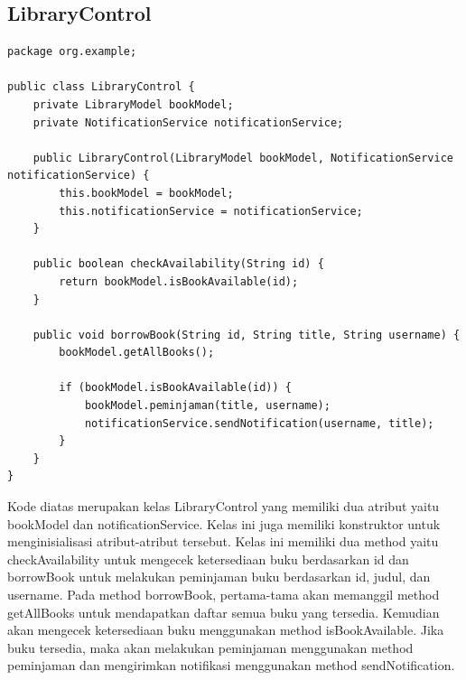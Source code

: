 \documentclass[a4paper,12pt]{article}
\begin{document}
\subsection{LibraryControl}
\begin{lstlisting}[style=javastyle, caption={LibraryControl.java}]
package org.example;

public class LibraryControl {
    private LibraryModel bookModel;
    private NotificationService notificationService;

    public LibraryControl(LibraryModel bookModel, NotificationService notificationService) {
        this.bookModel = bookModel;
        this.notificationService = notificationService;
    }

    public boolean checkAvailability(String id) {
        return bookModel.isBookAvailable(id);
    }

    public void borrowBook(String id, String title, String username) {
        bookModel.getAllBooks();

        if (bookModel.isBookAvailable(id)) {
            bookModel.peminjaman(title, username);
            notificationService.sendNotification(username, title);
        }
    }
}
\end{lstlisting}

Kode diatas merupakan kelas LibraryControl yang memiliki dua atribut yaitu bookModel dan notificationService. Kelas ini juga memiliki konstruktor untuk menginisialisasi atribut-atribut tersebut. Kelas ini memiliki dua method yaitu checkAvailability untuk mengecek ketersediaan buku berdasarkan id dan borrowBook untuk melakukan peminjaman buku berdasarkan id, judul, dan username. Pada method borrowBook, pertama-tama akan memanggil method getAllBooks untuk mendapatkan daftar semua buku yang tersedia. Kemudian akan mengecek ketersediaan buku menggunakan method isBookAvailable. Jika buku tersedia, maka akan melakukan peminjaman menggunakan method peminjaman dan mengirimkan notifikasi menggunakan method sendNotification.
\end{document}
